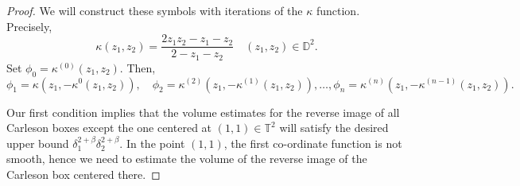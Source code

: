 \documentclass[12pt]{amsart}
\numberwithin{equation}{section}
\begin{document}
\begin{proof}
We will construct these symbols with iterations of the $\kappa$ function. Precisely,
$$\kappa(z_1,z_2)=\frac{2z_1z_2-z_1-z_2}{2-z_1-z_2}\quad (z_1,z_2)\in\mathbb{D}^2.$$
Set $\phi_0=\kappa^{(0)}(z_1,z_2).$ Then,
$$\phi_1=\kappa(z_1,-\kappa^0(z_1,z_2)),\quad \phi_2=\kappa^{(2)}(z_1,-\kappa^{(1)}(z_1,z_2)),\dots, \phi_n=\kappa^{(n)}(z_1,-\kappa^{(n-1)}(z_1,z_2)).$$

Our first condition implies that the volume estimates for the reverse image of all Carleson boxes except the one centered at $(1,1)\in\mathbb{T}^2$ will satisfy the desired upper bound $\delta_1^{2+\beta}\delta_2^{2+\beta}.$ In the point $(1,1)$, the first co-ordinate function is not smooth, hence we need to estimate the volume of the reverse image of the Carleson box centered there.


\end{proof}
\end{document}
